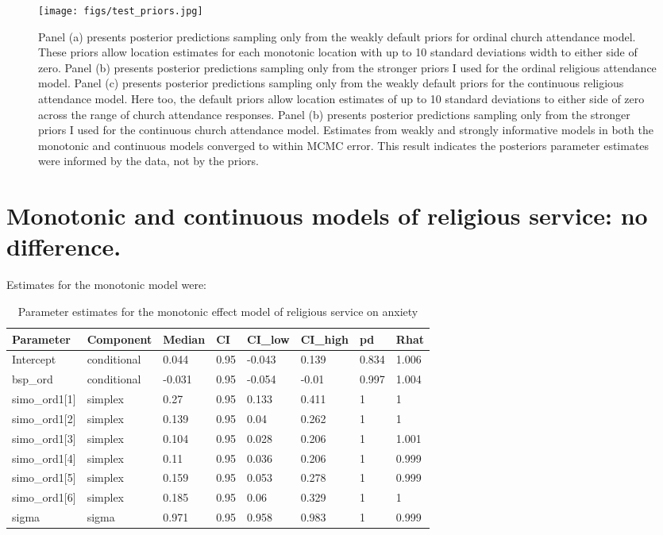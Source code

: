 \documentclass[]{interact}
\theoremstyle{plain}%
\theoremstyle{definition}
\theoremstyle{remark}
\begin{document}
\begin{figure}
\centering
    \caption{Panel (a) presents posterior predictions sampling only from the weakly default priors for ordinal church attendance model. These priors allow location estimates for each monotonic location with up to 10 standard deviations width to either side of zero. Panel (b) presents posterior predictions sampling only from the stronger priors I used for the ordinal religious attendance model. Panel (c) presents posterior predictions sampling only from the weakly default priors for the continuous religious attendance model. Here too, the default priors allow location estimates of up to 10 standard deviations to either side of zero across the range of church attendance responses. Panel (b) presents posterior predictions sampling only from the stronger priors I used for the continuous church attendance model. Estimates from weakly and strongly informative models in both the monotonic and continuous models converged to within MCMC error. This result indicates the posteriors parameter estimates were informed by the data, not by the priors.}
    \texttt{[image: figs/test\_priors.jpg]}
    \label{fig:Figure3}
\end{figure}

\newpage
\section{Monotonic and continuous models of religious service: no difference.}
\label{app:monotonic}

Estimates for the monotonic model were:

\begin{table}[h!bt]
\caption{Parameter estimates for the monotonic effect model of religious service on anxiety}
\centering
\begin{tabular}[t]{llllllll}
\toprule
Parameter & Component & Median & CI & CI\_low & CI\_high & pd & Rhat\\
\midrule
Intercept & conditional & 0.044 & 0.95 & -0.043 & 0.139 & 0.834 & 1.006\\
bsp\_ord & conditional & -0.031 & 0.95 & -0.054 & -0.01 & 0.997 & 1.004\\
simo\_ord1[1] & simplex & 0.27 & 0.95 & 0.133 & 0.411 & 1 & 1\\
simo\_ord1[2] & simplex & 0.139 & 0.95 & 0.04 & 0.262 & 1 & 1\\
simo\_ord1[3] & simplex & 0.104 & 0.95 & 0.028 & 0.206 & 1 & 1.001\\
\addlinespace
simo\_ord1[4] & simplex & 0.11 & 0.95 & 0.036 & 0.206 & 1 & 0.999\\
simo\_ord1[5] & simplex & 0.159 & 0.95 & 0.053 & 0.278 & 1 & 0.999\\
simo\_ord1[6] & simplex & 0.185 & 0.95 & 0.06 & 0.329 & 1 & 1\\
sigma & sigma & 0.971 & 0.95 & 0.958 & 0.983 & 1 & 0.999\\
\bottomrule
\end{tabular}
\label{tab:bayesmonotonic}
\end{table}
\end{document}
